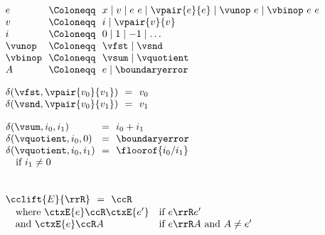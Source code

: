 \begin{flushleft}

\\
$\begin{array}{l@{~~}c@{~~}l}
  e & \Coloneqq & x \mid v \mid e~e \mid \vpair{e}{e} \mid \vunop~e \mid \vbinop~e~e
\\
  v & \Coloneqq & i \mid \vpair{v}{v}
\\
  i & \Coloneqq & 0 \mid 1 \mid -1 \mid \ldots
\\
  \vunop & \Coloneqq & \vfst \mid \vsnd
\\
  \vbinop & \Coloneqq & \vsum \mid \vquotient
\\
  A & \Coloneqq & e \mid \boundaryerror
\end{array}$

\medskip
\begin{minipage}[t]{0.38\columnwidth}
$\begin{array}{l@{~~}c@{~~}l}
  \delta(\vfst, \vpair{v_0}{v_1}) & = & v_0
\\
  \delta(\vsnd, \vpair{v_0}{v_1}) & = & v_1
\end{array}$
\end{minipage}%
\begin{minipage}[t]{0.5\columnwidth}
$\begin{array}{l@{~~}c@{~~}l}
  \delta(\vsum, i_0, i_1) & = & i_0 + i_1
\\
  \delta(\vquotient, i_0, 0) & = & \boundaryerror
\\
  \delta(\vquotient, i_0, i_1) & = & \floorof{i_0 / i_1}
\\ \multicolumn{3}{l}{\mbox{\quad if $i_1 \neq 0$}}
\end{array}$
\end{minipage}

\\
$\begin{array}{l@{~~}c@{~~}l}
  \cclift{E}{\rrR} & = & \ccR
\end{array}$
\\[0.1ex]
$\begin{array}{l l}
\mbox{\quad where $\ctxE{e} \ccR \ctxE{e'}$} & \mbox{if $e \rrR e'$}
\\
\mbox{\quad and $\ctxE{e} \ccR A$} & \mbox{if $e \rrR A$ and $A \neq e'$}
\end{array}$

\end{flushleft}
